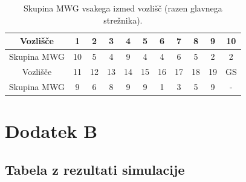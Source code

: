 \documentclass[a4paper, 12pt]{book}
\begin{document}
\begin{table}[h]
  \begin{center}
    \begin{tabulary}{1.0\textwidth}{
      | C | C | C | C | C | C | C | C | C | C | C |
    }
      \hline
      Vozlišče    &  1 & 2 & 3 & 4 & 5 & 6 & 7 & 8 & 9 & 10 \\ \hline
      Skupina MWG & 10 & 5 & 4 & 9 & 4 & 4 & 6 & 5 & 2 &  2 \\
      \hline \hline
      Vozlišče    & 11 & 12 & 13 & 14 & 15 & 16 & 17 & 18 & 19 & GS \\ \hline
      Skupina MWG &  9 &  6 &  8 &  9 &  9 &  1 &  3 &  5 &  9 & - \\
      \hline
    \end{tabulary}
  \end{center}

  \caption{Skupina MWG vsakega izmed vozlišč (razen glavnega strežnika).}
  \label{tbl:sim_nodes_mwg}
\end{table}

\chapter*{Dodatek B}
\section*{Tabela z rezultati simulacije}
\end{document}
